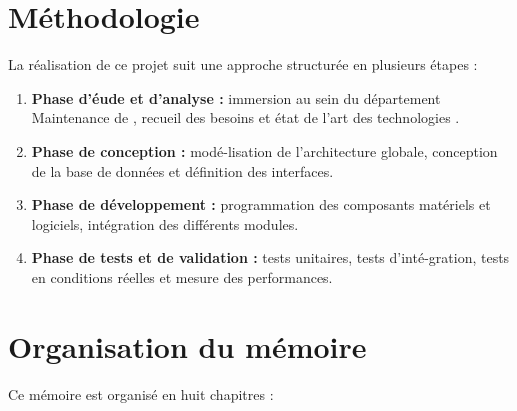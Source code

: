 \section{M\'ethodologie}

La r\'ealisation de ce projet suit une approche structur\'ee en plusieurs \'etapes :

\begin{enumerate}
    \item \textbf{Phase d'\'eude et d'analyse :} immersion au sein du d\'epartement Maintenance de \sews, recueil des besoins et \'etat de l'art des technologies \iiot.
    \item \textbf{Phase de conception :} mod\'e-lisation de l'architecture globale, conception de la base de donn\'ees et d\'efinition des interfaces.
    \item \textbf{Phase de d\'eveloppement :} programmation des composants mat\'eriels et logiciels, int\'egration des diff\'erents modules.
    \item \textbf{Phase de tests et de validation :} tests unitaires, tests d'int\'e-gration, tests en conditions r\'eelles et mesure des performances.
\end{enumerate}

\section{Organisation du m\'emoire}

Ce m\'emoire est organis\'e en huit chapitres :

